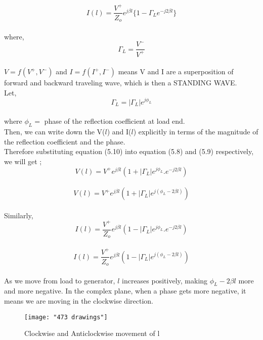 	\begin{equation}
	I(l) = \frac{V^+}{Z_o}e ^{j \beta l}  \{ 1 - \Gamma_L e^{-j 2 \beta l}\}
	\end{equation}\\
		where,
	\begin{equation*}
	\Gamma _L = \frac{V^-}{V^+}
	\end{equation*}\\
$V = f( V^{+} , V^{-})$ and $I = f(I^{+} , I^{-})$ means V and I are a superposition of forward and backward traveling wave, which is then a STANDING WAVE.\\
Let,
\begin{equation}
\Gamma_L = |\Gamma_L|e^{j\phi_L}
\end{equation}\\
where $\phi_L =$ phase of the reflection coefficient at load end.\\
 Then, we can write down the V($l$) and I($l$) explicitly in terms of the magnitude of the reflection coefficient and the phase.\\
 Therefore substituting equation (5.10) into equation (5.8) and (5.9) respectively, we will get ;
 \begin{equation*}
 V(l) = V^{+}e^{j\beta l}(1 + |\Gamma_L|e^{j\phi_L} . e^{-j 2 \beta l})
 \end{equation*}\\
 \begin{equation}
 V(l) = V^{+}e^{j\beta l}(1 + |\Gamma_L|  e^{j(\phi_L -2 \beta l)})
 \end{equation}\\
 Similarly,\\
 \begin{equation*}
 I(l) = \frac{V^+}{Z_o}e ^{j \beta l}( 1 - |\Gamma_L|e^{j\phi_L} . e^{-j 2 \beta l})
 \end{equation*}\\
\begin{equation}
I(l) = \frac{V^+}{Z_o}e ^{j \beta l}( 1 -|\Gamma_L|  e^{j(\phi_L -2 \beta l)})
\end{equation}\\
As we move from load to generator, $l$ increases positively, making $\phi_L -2 \beta l$ more and more negative. In the complex plane, when a phase gets more negative, it means we are moving in the clockwise direction.
	\begin{figure}[h]
		\centering
		\texttt{[image: "473 drawings"]}
		\caption{Clockwise and Anticlockwise movement of l}
		\label{fig:473-drawings}
	\end{figure}
	
